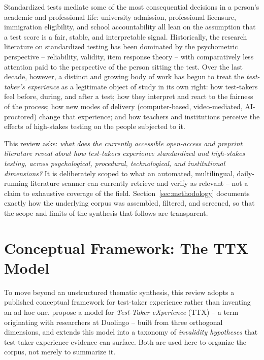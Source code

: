 \documentclass[11pt]{article}
\begin{document}
Standardized tests mediate some of the most consequential decisions in a person's academic and professional life: university admission, professional licensure, immigration eligibility, and school accountability all lean on the assumption that a test score is a fair, stable, and interpretable signal. Historically, the research literature on standardized testing has been dominated by the psychometric perspective -- reliability, validity, item response theory -- with comparatively less attention paid to the perspective of the person sitting the test. Over the last decade, however, a distinct and growing body of work has begun to treat the \emph{test-taker's experience} as a legitimate object of study in its own right: how test-takers feel before, during, and after a test; how they interpret and react to the fairness of the process; how new modes of delivery (computer-based, video-mediated, AI-proctored) change that experience; and how teachers and institutions perceive the effects of high-stakes testing on the people subjected to it.

This review asks: \emph{what does the currently accessible open-access and preprint literature reveal about how test-takers experience standardized and high-stakes testing, across psychological, procedural, technological, and institutional dimensions?} It is deliberately scoped to what an automated, multilingual, daily-running literature scanner can currently retrieve and verify as relevant -- not a claim to exhaustive coverage of the field. Section~\ref{sec:methodology} documents exactly how the underlying corpus was assembled, filtered, and screened, so that the scope and limits of the synthesis that follows are transparent.

\section{Conceptual Framework: The TTX Model}
\label{sec:ttxmodel}

To move beyond an unstructured thematic synthesis, this review adopts a published conceptual framework for test-taker experience rather than inventing an ad hoc one. \citet{araneda2025ttxmodel} propose a model for \emph{Test-Taker eXperience} (TTX) -- a term originating with researchers at Duolingo \citep{burstein2021ttxorigin} -- built from three orthogonal dimensions, and \citet{araneda2023dissertation} extends this model into a taxonomy of \emph{invalidity hypotheses} that test-taker experience evidence can surface. Both are used here to organize the corpus, not merely to summarize it.
\end{document}
